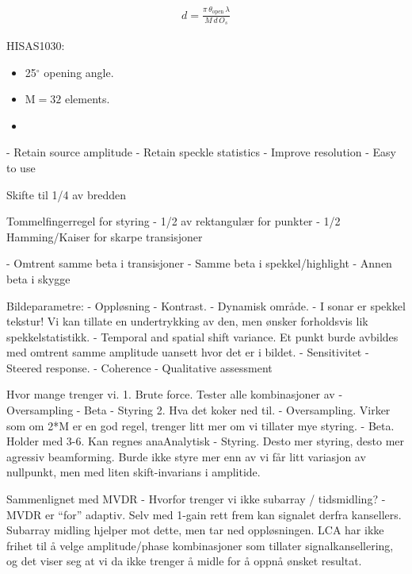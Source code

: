 \begin{align*}
d = \frac{\pi\,\theta_\text{open}\,\lambda}{M\,d\,O_s}
\end{align*}


HISAS1030:
\begin{itemize}
\item 25$^\circ$ opening angle.
\item M$=32$ elements.
\item 
\end{itemize}

- Retain source amplitude
- Retain speckle statistics
- Improve resolution
- Easy to use



Skifte til 1/4 av bredden 



Tommelfingerregel for styring
- 1/2 av rektangulær for punkter
- 1/2 Hamming/Kaiser for skarpe transisjoner

- Omtrent samme beta i transisjoner
- Samme beta i spekkel/highlight
- Annen beta i skygge


Bildeparametre:
- Oppløsning
- Kontrast.
- Dynamisk område.
- I sonar er spekkel tekstur! Vi kan tillate en undertrykking av den, men ønsker forholdsvis lik spekkelstatistikk.
- Temporal and spatial shift variance. Et punkt burde avbildes med omtrent samme amplitude uansett hvor det er i bildet.
- Sensitivitet
- Steered response.
- Coherence
- Qualitative assessment

Hvor mange trenger vi.
1. Brute force. Tester alle kombinasjoner av
   - Oversampling
   - Beta
   - Styring
2. Hva det koker ned til.
   - Oversampling. Virker som om 2*M er en god regel, trenger litt mer om vi tillater mye styring.
   - Beta. Holder med 3-6. Kan regnes anaAnalytisk
   - Styring. Desto mer styring, desto mer agressiv beamforming. Burde ikke styre mer enn av vi får litt variasjon av nullpunkt, men med liten skift-invarians i amplitide.



Sammenlignet med MVDR
- Hvorfor trenger vi ikke subarray / tidsmidling?
- MVDR er ``for'' adaptiv. Selv med 1-gain rett frem kan signalet derfra kansellers. Subarray midling hjelper mot dette, men tar ned oppløsningen. LCA har ikke frihet til å velge amplitude/phase kombinasjoner som tillater signalkansellering, og det viser seg at vi da ikke trenger å midle for å oppnå ønsket resultat.

% 




